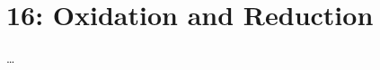 \chapter{16: Oxidation and Reduction}\label{16: Oxidation and Reduction}
\begin{adjustwidth}{1cm}{1cm}
  \dots
\end{adjustwidth}


